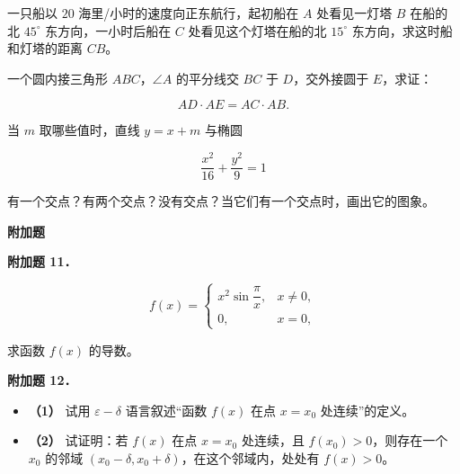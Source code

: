 \begin{question}
一只船以 $20$ 海里/小时的速度向正东航行，起初船在 $A$ 处看见一灯塔 $B$ 在船的北 $45^\circ$ 东方向，一小时后船在 $C$ 处看见这个灯塔在船的北 $15^\circ$ 东方向，求这时船和灯塔的距离 $CB$。

\end{question}
\begin{question}
一个圆内接三角形 $ABC$，$\angle A$ 的平分线交 $BC$ 于 $D$，交外接圆于 $E$，求证：

\nopagebreak[4]
\[
AD\cdot AE=AC\cdot AB.
\]

\end{question}
\begin{question}
当 $m$ 取哪些值时，直线 $y=x+m$ 与椭圆

\nopagebreak[4]
\[
\frac{x^2}{16}+\frac{y^2}{9}=1
\]

有一个交点？有两个交点？没有交点？当它们有一个交点时，画出它的图象。

\begin{gktip}
\Needspace{0.25\textheight}
\textbf{附加题}
\end{gktip}

\textbf{附加题 11．}

\nopagebreak[4]
\[
f(x)=
\begin{cases}
x^2\sin\dfrac\pi x,&x\ne0,\\
0,&x=0,
\end{cases}
\]

求函数 $f(x)$ 的导数。

\textbf{附加题 12．}

\begin{itemize}
\item \textbf{（1）} 试用 $\varepsilon-\delta$ 语言叙述“函数 $f(x)$ 在点 $x=x_0$ 处连续”的定义。
\end{itemize}

\begin{itemize}
\item \textbf{（2）} 试证明：若 $f(x)$ 在点 $x=x_0$ 处连续，且 $f(x_0)>0$，则存在一个 $x_0$ 的邻域 $(x_0-\delta,x_0+\delta)$，在这个邻域内，处处有 $f(x)>0$。
\end{itemize}

\end{question}